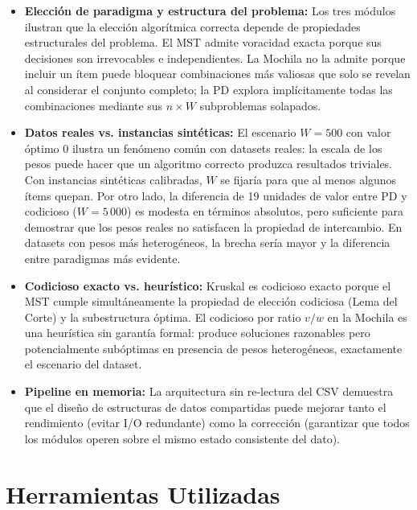 \documentclass[11pt, a4paper]{article}
\begin{document}
\begin{itemize}
  \item \textbf{Elección de paradigma y estructura del problema:} Los tres módulos
        ilustran que la elección algorítmica correcta depende de propiedades estructurales
        del problema. El MST admite voracidad exacta porque sus decisiones son irrevocables
        e independientes. La Mochila no la admite porque incluir un ítem puede bloquear
        combinaciones más valiosas que solo se revelan al considerar el conjunto completo;
        la PD explora implícitamente todas las combinaciones mediante sus $n\times W$
        subproblemas solapados.

  \item \textbf{Datos reales vs. instancias sintéticas:} El escenario $W=500$ con valor
        óptimo 0 ilustra un fenómeno común con datasets reales: la escala de los pesos
        puede hacer que un algoritmo correcto produzca resultados triviales. Con instancias
        sintéticas calibradas, $W$ se fijaría para que al menos algunos ítems quepan. Por
        otro lado, la diferencia de 19 unidades de valor entre PD y codicioso ($W=5\,000$)
        es modesta en términos absolutos, pero suficiente para demostrar que los pesos reales
        no satisfacen la propiedad de intercambio. En datasets con pesos más heterogéneos,
        la brecha sería mayor y la diferencia entre paradigmas más evidente.

  \item \textbf{Codicioso exacto vs. heurístico:} Kruskal es codicioso exacto porque el
        MST cumple simultáneamente la propiedad de elección codiciosa (Lema del Corte) y
        la subestructura óptima. El codicioso por ratio $v/w$ en la Mochila es una heurística
        sin garantía formal: produce soluciones razonables pero potencialmente subóptimas
        en presencia de pesos heterogéneos, exactamente el escenario del dataset.

  \item \textbf{Pipeline en memoria:} La arquitectura sin re-lectura del CSV demuestra
        que el diseño de estructuras de datos compartidas puede mejorar tanto el rendimiento
        (evitar I/O redundante) como la corrección (garantizar que todos los módulos operen
        sobre el mismo estado consistente del dato).
\end{itemize}

\section{Herramientas Utilizadas}
\end{document}
